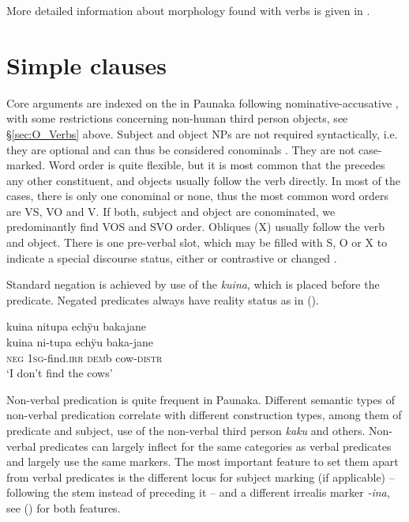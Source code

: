 More detailed information about morphology found with verbs is given in .

\section{Simple clauses}\label{sec:O_SimpleClauses}

Core arguments are indexed on the  in Paunaka following nom\-i\-na\-tive-ac\-cusative , with some restrictions concerning non-human third person objects, see §\ref{sec:O_Verbs} above. Subject and object NPs are not required syntactically, i.e. they are optional and can thus be considered conominals \citep[cf.][]{Haspelmath2013}. They are not case-marked. Word order is quite flexible, but it is most common that the  precedes any other constituent, and objects usually follow the verb directly. In most of the cases, there is only one conominal or none, thus the most common word orders are VS, VO and V. If both, subject and object are conominated, we predominantly find VOS and SVO order. Obliques (X) usually follow the verb and object. There is one pre-verbal slot, which may be filled with S, O or X to indicate a special discourse status, either  or contrastive or changed .

Standard negation is achieved by use of the  \textit{kuina}, which is placed before the predicate. Negated predicates always have  reality status as in ().

\ea\label{ex:Sketch-Negation}
\begingl
\glpreamble kuina nitupa echÿu bakajane\\
\gla kuina ni-tupa echÿu baka-jane\\
\glb \textsc{neg} 1\textsc{sg}-find.\textsc{irr} \textsc{dem}b cow-\textsc{distr}\\
\glft ‘I don’t find the cows’\\
\endgl
\xe
{}

Non-verbal predication is quite frequent in Paunaka. Different semantic types of non-verbal predication correlate with different construction types, among them  of predicate and subject, use of the non-verbal third person  \textit{kaku} and others. Non-verbal predicates can largely inflect for the same categories as verbal predicates and largely use the same markers. The most important feature to set them apart from verbal predicates is the different locus for subject marking (if applicable) – following the stem instead of preceding it – and a different irrealis marker \textit{-ina}, see () for both features.

